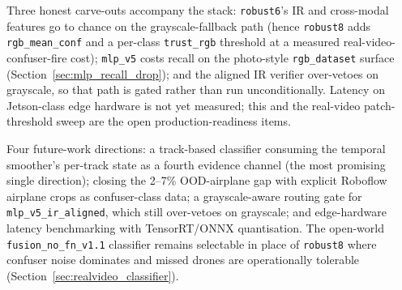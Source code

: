 Three honest carve-outs accompany the stack: \texttt{robust6}'s IR and cross-modal features go to chance on the grayscale-fallback path (hence \texttt{robust8} adds \texttt{rgb\_mean\_conf} and a per-class \texttt{trust\_rgb} threshold at a measured real-video-confuser-fire cost); \texttt{mlp\_v5} costs recall on the photo-style \texttt{rgb\_dataset} surface (Section~\ref{sec:mlp_recall_drop}); and the aligned IR verifier over-vetoes on grayscale, so that path is gated rather than run unconditionally. Latency on Jetson-class edge hardware is not yet measured; this and the real-video patch-threshold sweep are the open production-readiness items.

Four future-work directions: a track-based classifier consuming the temporal smoother's per-track state as a fourth evidence channel (the most promising single direction); closing the 2--7\% OOD-airplane gap with explicit Roboflow airplane crops as confuser-class data; a grayscale-aware routing gate for \texttt{mlp\_v5\_ir\_aligned}, which still over-vetoes on grayscale; and edge-hardware latency benchmarking with TensorRT/ONNX quantisation. The open-world \texttt{fusion\_no\_fn\_v1.1} classifier remains selectable in place of \texttt{robust8} where confuser noise dominates and missed drones are operationally tolerable (Section~\ref{sec:realvideo_classifier}).

